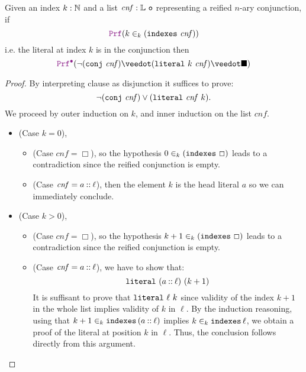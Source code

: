 \begin{lemma}
Given an index $k: \mathbb{N}$ and a list $\mathit{cnf}: \mathbb{L}~\texttt{o}$ representing a reified $n$-ary conjunction, if
\[
  \prf (k \in_k (\kw{indexes}~\mathit{cnf}))
\]
i.e. the literal at index $k$ is in the conjunction then
\[
  \prfcl (\neg (\kw{conj}~\mathit{cnf}) \veedot (\kw{literal}~k~\mathit{cnf}) \veedot \nil)
\]
\begin{proof}
By interpreting clause as disjunction it suffices to prove:
\[
    \neg (\texttt{\upshape{conj}}~\mathit{cnf}) \lor (\texttt{\upshape{literal}}~\mathit{cnf}~k).
\]
We proceed by outer induction on $k$, and inner induction on the list $\mathit{cnf}$.
\begin{itemize}
  \item (Case $k = 0$),
    \begin{itemize}
      \item (Case $\mathit{cnf} = \Box$), so the hypothesis $0 \in_k (\texttt{\upshape{indexes}}~\Box)$ leads to a contradiction since the reified conjunction is empty.
      \item (Case $\mathit{cnf} = a \mathbin{::} \ell$),  then the element $k$ is the head literal $a$ so we can immediately conclude.
    \end{itemize}
  \item (Case $k > 0$),
      \begin{itemize}
      \item (Case $\mathit{cnf} = \Box$), so the hypothesis $k + 1 \in_k (\texttt{\upshape{indexes}}~\Box)$ leads to a contradiction since the reified conjunction is empty.
      \item (Case $\mathit{cnf} = a \mathbin{::} \ell$), we have to show that:
        \[
            \texttt{\upshape{literal}}~(a \mathbin{::} \ell)~(k+1)
        \]
        It is suffisant to prove that \( \texttt{\upshape{literal}}~\ell~k \) since validity of the index $k+1$ in the whole list implies validity of $k$ in $\ell$.
        By the induction reasoning, using that $k+1 \in_k \texttt{\upshape{indexes}}\,(a \mathbin{::} \ell)$ implies $k \in_k \texttt{\upshape{indexes}}\,\ell$, we obtain a proof of the literal at position $k$ in $\ell$.
        Thus, the conclusion follows directly from this argument.
    \end{itemize}
\end{itemize}
\end{proof}
\label{lem:and-pos}
\end{lemma}

